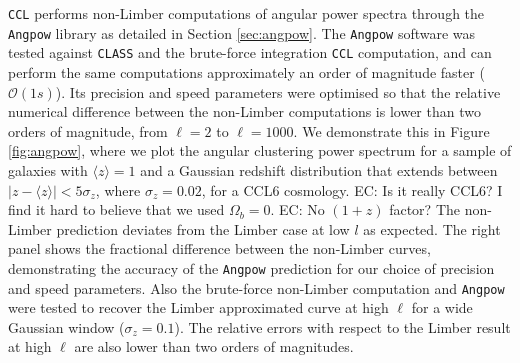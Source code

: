 \documentclass[\docopts]{\docclass}
\newcommand{\elisa}[1]{\textcolor{green!10!orange!90!}{EC: #1}}
\newcommand{\ccl}{{\tt CCL}\xspace}
\newcommand{\class}{{\tt CLASS}\xspace}
\begin{document}
\ccl performs non-Limber computations of angular power spectra through the {\tt Angpow} library as detailed in Section \ref{sec:angpow}. The \texttt{Angpow} software was tested against \class and the brute-force integration \ccl computation, and can perform the same computations approximately an order of magnitude faster ($\mathcal{O}(1s)$). Its precision and speed parameters were optimised so that the relative numerical difference between the non-Limber computations is lower than two orders of magnitude, from $\ell=2$ to $\ell=1000$. We demonstrate this in Figure \ref{fig:angpow}, where we plot the angular clustering power spectrum for a sample of galaxies with $\langle z \rangle=1$ and a Gaussian redshift distribution that extends between $|z-\langle z \rangle|<5\sigma_z$, where $\sigma_z=0.02$, for a CCL6 cosmology. \elisa{Is it really CCL6? I find it hard to believe that we used $\Omega_b=0$.} \elisa{No $(1+z)$ factor?} The non-Limber prediction deviates from the Limber case at low $l$ as expected. The right panel shows the fractional difference between the non-Limber curves, demonstrating the accuracy of the {\tt Angpow} prediction for our choice of precision and speed parameters. Also the brute-force non-Limber computation and {\tt Angpow} were tested to recover the Limber approximated curve at high $\ell$ for a wide Gaussian window ($\sigma_z=0.1$). The relative errors with respect to the Limber result at high $\ell$ are also lower than two orders of magnitudes.
\end{document}
